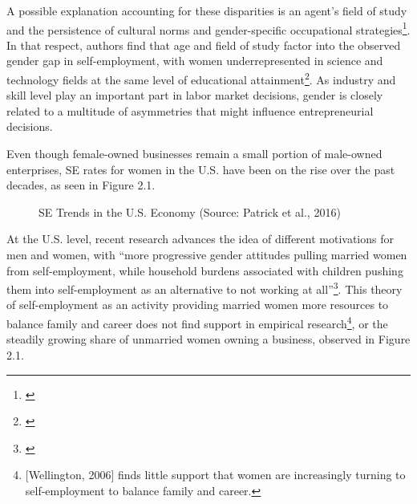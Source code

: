 A possible explanation accounting for these disparities is an agent’s field of study and the persistence of cultural norms and gender-specific occupational strategies\footnote{\cite{CowlingTaylor2001}}. In that respect, authors find that age and field of study factor into the observed gender gap in self-employment, with women underrepresented in science and technology fields at the same level of educational attainment\footnote{\cite{GeorgellisWall2005}}. As industry and skill level play an important part in labor market decisions, gender is closely related to a multitude of asymmetries that might influence entrepreneurial decisions. 

Even though female-owned businesses remain a small portion of male-owned enterprises, SE rates for women in the U.S. have been on the rise over the past decades, as seen in Figure 2.1. 

\begin{figure}[hbtp]
    \caption{SE Trends in the U.S. Economy (Source: Patrick et al., 2016)} 
\end{figure}

At the U.S. level, recent research advances the idea of different motivations for men and women, with ``more progressive gender attitudes pulling married women from self-employment, while household burdens associated with children pushing them into self-employment as an alternative to not working at all''\footnote{\cite{PatrickStephensWeinstein2016}}. This theory of self-employment as an activity providing married women more resources to balance family and career does not find support in empirical research\footnote{[Wellington, 2006] finds little support that women are increasingly turning to self-employment to balance family and career.}, or the steadily growing share of unmarried women owning a business, observed in Figure 2.1.

